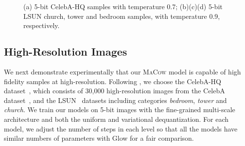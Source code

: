 \documentclass{article}
\begin{document}
\begin{figure*}[t]
\centering
\begin{minipage}[t]{1.0\textwidth}
\begin{minipage}[t]{0.49\textwidth}
\end{minipage}
\begin{minipage}[t]{0.49\textwidth}
\end{minipage}
\end{minipage}
\begin{minipage}[t]{1.0\textwidth}
\begin{minipage}[t]{0.49\textwidth}
\end{minipage}
\begin{minipage}[t]{0.49\textwidth}
\end{minipage}
\end{minipage}
\caption{(a) 5-bit  CelebA-HQ samples with temperature 0.7; (b)(c)(d) 5-bit  LSUN church, tower and bedroom samples, with temperature 0.9, respectively.}
\label{fig:celeba:sample}
\end{figure*}

\subsection{High-Resolution Images}
We next demonstrate experimentally that our \textsc{MaCow} model is capable of high fidelity samples at high-resolution.
Following \citet{kingma2018glow}, we choose the CelebA-HQ dataset~\citep{karras2017progressive}, which consists of 30,000 high-resolution images from the CelebA dataset~\citep{liu2015faceattributes}, and the LSUN~\citep{yu15lsun} datasets including categories \emph{bedroom}, \emph{tower} and \emph{church}.
We train our models on 5-bit images with the fine-grained multi-scale architecture and both the uniform and variational dequantization.
For each model, we adjust the number of steps in each level so that all the models have similar numbers of parameters with Glow for a fair comparison.
\end{document}
